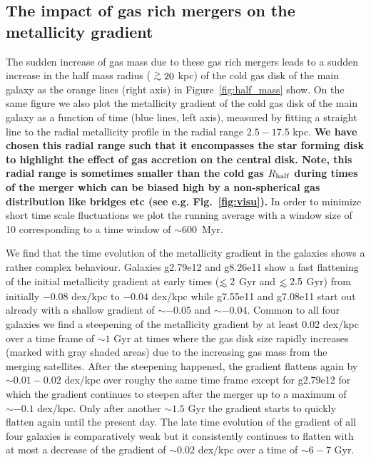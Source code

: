 \documentclass[useAMS,usenatbib]{mnras}
\newcommand{\gtsima}{$\; \buildrel > \over \sim \;$}
\newcommand{\gsim}{\lower.5ex\hbox{\gtsima}}
\def\lesssim{\mathrel{\hbox{\rlap{\hbox{\lower4pt\hbox{$\sim$}}}\hbox{$<$}}}}
\begin{document}
\subsection{The impact of gas rich mergers on the metallicity gradient} \label{sec:merger}

The sudden increase of gas mass due to these gas rich mergers leads to a sudden increase in the half mass radius ($\gsim20$ kpc) of the cold gas disk of the main galaxy as the orange lines (right axis) in Figure~\ref{fig:half_mass} show. On the same figure we also plot the metallicity gradient of the cold gas disk of the main galaxy as a function of time (blue lines, left axis), measured by fitting a straight line to the radial metallicity profile in the radial range $2.5 - 17.5$ kpc. \textbf{We have chosen this radial range such that it encompasses the star forming disk to highlight the effect of gas accretion on the central disk. Note, this radial range is sometimes smaller than the cold gas $R_{\rm half}$ during times of the merger which can be biased high by a non-spherical gas distribution like bridges etc (see e.g. Fig.~\ref{fig:visu}).} In order to minimize short time scale fluctuations we plot the running average with a window size of 10 corresponding to a time window of $\sim600$~Myr. 

We find that the time evolution of the metallicity gradient in the galaxies shows a rather complex behaviour. Galaxies g2.79e12 and g8.26e11 show a fast flattening of the initial metallicity gradient at early times ($\lesssim2$ Gyr and $\lesssim 2.5$ Gyr) from initially $-0.08$ dex/kpc to $-0.04$ dex/kpc while g7.55e11 and g7.08e11 start out already with a shallow gradient of $\sim-0.05$ and $\sim-0.04$.
Common to all four galaxies we find a steepening of the metallicity gradient by at least $0.02$ dex/kpc over a time frame of $\sim1$ Gyr at times where the gas disk size rapidly increases (marked with gray shaded areas) due to the increasing gas mass from the merging satellites. After the steepening happened, the gradient flattens again by $\sim0.01-0.02$ dex/kpc over roughy the same time frame except for g2.79e12 for which the gradient continues to steepen after the merger up to a maximum of $\sim-0.1$ dex/kpc. Only after another $\sim1.5$ Gyr the gradient starts to quickly flatten again until the present day. The late time evolution of the gradient of all four galaxies is comparatively weak but it consistently continues to flatten with at most a decrease of the gradient of $\sim0.02$ dex/kpc over a time of $\sim6-7$ Gyr.
\end{document}
